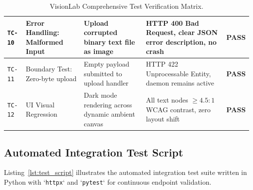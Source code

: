 \begin{table}[htbp]
\begin{tabularx}{\textwidth}{|p{1.4cm}|p{3.2cm}|p{3.6cm}|p{4.0cm}|p{1.2cm}|}
        \hline
        \texttt{TC-10} & Error Handling: Malformed Input & Upload corrupted binary text file as image & HTTP 400 Bad Request, clear JSON error description, no crash & \textbf{PASS} \\
        \hline
        \texttt{TC-11} & Boundary Test: Zero-byte upload & Empty payload submitted to upload handler & HTTP 422 Unprocessable Entity, daemon remains active & \textbf{PASS} \\
        \hline
        \texttt{TC-12} & UI Visual Regression & Dark mode rendering across dynamic ambient canvas & All text nodes $\ge 4.5:1$ WCAG contrast, zero layout shift & \textbf{PASS} \\
        \hline
    \end{tabularx}
    \caption{VisionLab Comprehensive Test Verification Matrix.}
    \label{tab:test_matrix}
\end{table}

\subsection{Automated Integration Test Script}
Listing~\ref{lst:test_script} illustrates the automated integration test suite written in Python with `\texttt{httpx}` and `\texttt{pytest}` for continuous endpoint validation.

